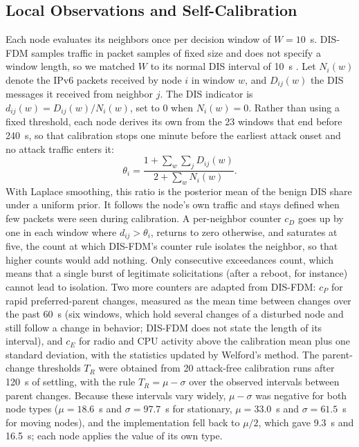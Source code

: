 \subsection{Local Observations and Self-Calibration}
Each node evaluates its neighbors once per decision window of $W=10$~s. DIS-FDM samples traffic in packet samples of fixed size and does not specify a window length, so we matched $W$ to its normal DIS interval of 10~s \cite{prajisha2025}. Let $N_i(w)$ denote the IPv6 packets received by node $i$ in window $w$, and $D_{ij}(w)$ the DIS messages it received from neighbor $j$. The DIS indicator is $d_{ij}(w)=D_{ij}(w)/N_i(w)$, set to $0$ when $N_i(w)=0$. Rather than using a fixed threshold, each node derives its own from the 23 windows that end before 240~s, so that calibration stops one minute before the earliest attack onset and no attack traffic enters it:
\begin{equation}
 \theta_i=\frac{1+\sum_w\sum_jD_{ij}(w)}{2+\sum_wN_i(w)}.
\end{equation}
With Laplace smoothing, this ratio is the posterior mean of the benign DIS share under a uniform prior. It follows the node's own traffic and stays defined when few packets were seen during calibration. A per-neighbor counter $c_D$ goes up by one in each window where $d_{ij}>\theta_i$, returns to zero otherwise, and saturates at five, the count at which DIS-FDM's counter rule isolates the neighbor, so that higher counts would add nothing. Only consecutive exceedances count, which means that a single burst of legitimate solicitations (after a reboot, for instance) cannot lead to isolation. Two more counters are adapted from DIS-FDM: $c_P$ for rapid preferred-parent changes, measured as the mean time between changes over the past 60~s (six windows, which hold several changes of a disturbed node and still follow a change in behavior; DIS-FDM does not state the length of its interval), and $c_E$ for radio and CPU activity above the calibration mean plus one standard deviation, with the statistics updated by Welford's method. The parent-change thresholds $T_R$ were obtained from 20 attack-free calibration runs after 120~s of settling, with the rule $T_R=\mu-\sigma$ over the observed intervals between parent changes. Because these intervals vary widely, $\mu-\sigma$ was negative for both node types ($\mu=18.6$~s and $\sigma=97.7$~s for stationary, $\mu=33.0$~s and $\sigma=61.5$~s for moving nodes), and the implementation fell back to $\mu/2$, which gave 9.3~s and 16.5~s; each node applies the value of its own type.

